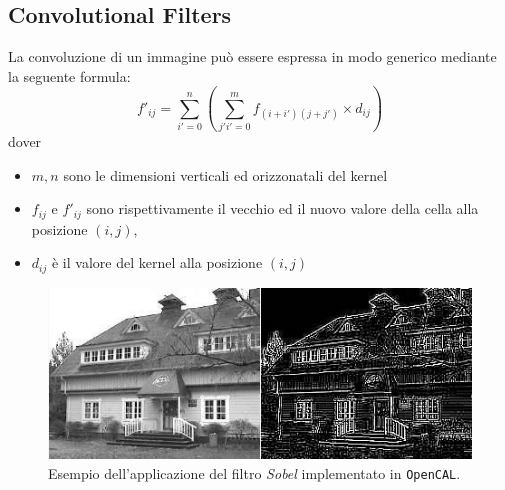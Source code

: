 \subsection{Convolutional Filters}
La convoluzione di un immagine può essere espressa in modo generico mediante la seguente formula:
\begin{equation}
f'_{ij} = \sum_{i'=0}^n (\sum_{j'i'=0}^m f_{(i+i')(j+j')}\times d_{ij})
\label{eq:convolution}
\end{equation}
dover 
\begin{itemize}
	\item $m,n$ sono le dimensioni verticali ed orizzonatali del kernel
	\item $f_{ij}$ e $f'_{ij}$ sono rispettivamente il vecchio ed il nuovo valore della cella alla posizione $(i,j)$,
	\item $d_{ij}$ è il valore del kernel alla posizione $(i,j)$ 
\end{itemize}
\begin{figure}[!htb]
	\includegraphics[width=\linewidth]{./images/sobel_example}
	
	\caption{Esempio dell'applicazione del filtro \textit{Sobel} implementato in \texttt{OpenCAL}. }
	\label{fig:sobel}
\end{figure}

